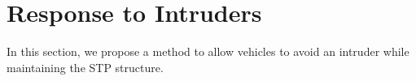 \section{Response to Intruders \label{sec:intruder}}
In this section, we propose a method to allow vehicles to avoid an intruder while maintaining the STP structure.
%
%
%
%
%
%

